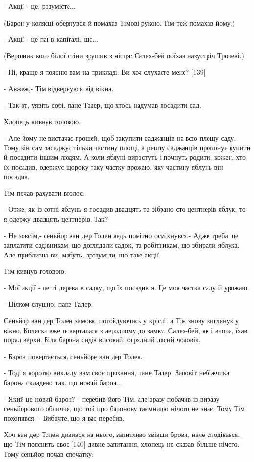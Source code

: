 - Акції - це, розумієте...

(Барон у колясці обернувся й помахав Тімові рукою. Тім теж помахав йому.)

- Акції - це паї в капіталі, що...

(Вершник коло білої стіни зрушив з місця: Салех-бей поїхав назустріч Трочеві.)

- Ні, краще я поясню вам на прикладі. Ви хоч слухаєте мене? [139]

- Авжеж,- Тім відвернувся від вікна.

- Так-от, уявіть собі, пане Талер, що хтось надумав посадити сад.

Хлопець кивнув головою.

- Але йому не вистачає грошей, щоб закупити саджанців на всю площу саду. Тому він сам засаджує тільки частину площі, а решту саджанців пропонує купити й посадити іншим людям. А коли яблуні виростуть і почнуть родити, кожен, хто їх посадив, одержує щороку таку частку врожаю, яку частину яблунь він посадив.

Тім почав рахувати вголос:

- Отже, як із сотні яблунь я посадив двадцять та зібрано сто центнерів яблук, то я одержу двадцять центнерів. Так?

- Не зовсім,- сеньйор ван дер Толен ледь помітно осміхнувся.- Адже треба ще заплатити садівникам, що доглядали садок, та робітникам, що збирали яблука. Але приблизно ви, мабуть, зрозуміли, що таке акції.

Тім кивнув головою.

- Мої акції - це ті дерева в садку, що їх посадив я. Це моя частка саду й урожаю.

- Цілком слушно, пане Талер.

Сеньйор ван дер Толен замовк, погойдуючись у кріслі, а Тім знову виглянув у вікно. Коляска вже поверталася з аеродрому до замку. Салех-бей, як і вчора, їхав поряд верхи. Біля барона сидів високий, огрядний лисий чоловік.

- Барон повертається, сеньйоре ван дер Толен.

- Тоді я коротко викладу вам своє прохання, пане Талер. Заповіт небіжчика барона складено так, що новий барон...

- Який це новий барон? - перебив його Тім, але зразу побачив із виразу сеньйорового обличчя, що той про баронову таємницю нічого не знає. Тому Тім похопився: - Вибачте, що я вас перебив.

Хоч ван дер Толен дивився на нього, запитливо звівши брови, наче сподівався, що Тім пояснить своє [140] дивне запитання, хлопець не сказав більше нічого. Тому сеньйор почав спочатку:

